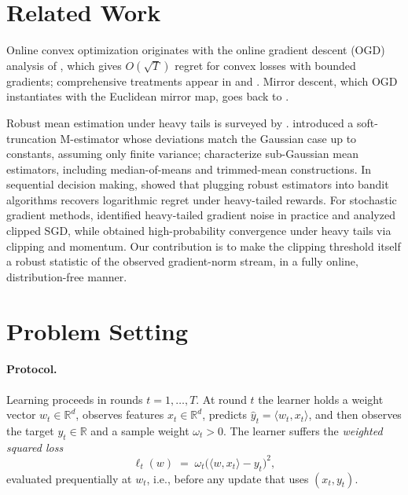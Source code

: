 \documentclass[11pt]{article}
\newcommand{\R}{\mathbb{R}}
\newcommand{\ip}[2]{\langle #1, #2 \rangle}
\begin{document}
\section{Related Work}

Online convex optimization originates with the online gradient descent (OGD) analysis of
\citet{zinkevich2003online}, which gives $O(\sqrt{T})$ regret for convex losses with
bounded gradients; comprehensive treatments appear in
\citet{cesabianchi2006prediction} and \citet{hazan2016introduction}. Mirror descent,
which OGD instantiates with the Euclidean mirror map, goes back to
\citet{nemirovski1983problem}.

Robust mean estimation under heavy tails is surveyed by \citet{lugosi2019mean}.
\citet{catoni2012challenging} introduced a soft-truncation M-estimator whose deviations
match the Gaussian case up to constants, assuming only finite variance;
\citet{devroye2016sub} characterize sub-Gaussian mean estimators, including
median-of-means and trimmed-mean constructions. In sequential decision making,
\citet{bubeck2013bandits} showed that plugging robust estimators into bandit algorithms
recovers logarithmic regret under heavy-tailed rewards. For stochastic gradient methods,
\citet{zhang2020adaptive} identified heavy-tailed gradient noise in practice and analyzed
clipped SGD, while \citet{cutkosky2021high} obtained high-probability convergence under
heavy tails via clipping and momentum. Our contribution is to make the clipping
threshold itself a robust statistic of the observed gradient-norm stream, in a fully
online, distribution-free manner.

\section{Problem Setting}

\paragraph{Protocol.} Learning proceeds in rounds $t = 1, \dots, T$. At round $t$ the
learner holds a weight vector $w_t \in \R^d$, observes features $x_t \in \R^d$, predicts
$\hat{y}_t = \ip{w_t}{x_t}$, and then observes the target $y_t \in \R$ and a sample
weight $\omega_t > 0$. The learner suffers the \emph{weighted squared loss}
\begin{equation}
\ell_t(w) \;=\; \omega_t \bigl( \ip{w}{x_t} - y_t \bigr)^2 ,
\end{equation}
evaluated prequentially at $w_t$, i.e., before any update that uses $(x_t, y_t)$.
\end{document}
